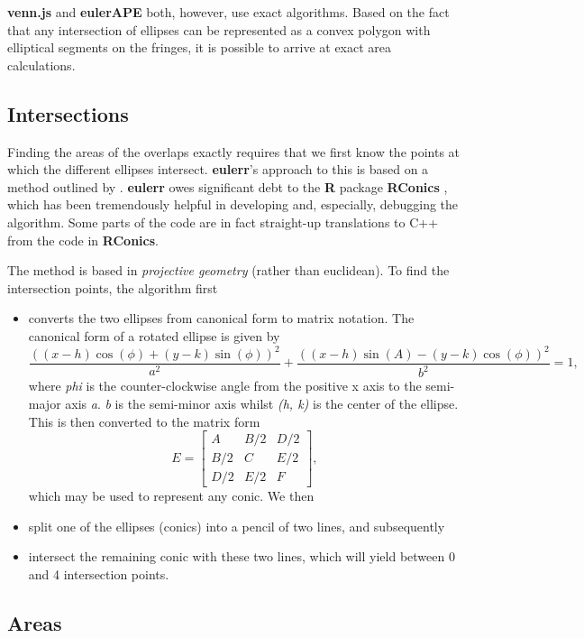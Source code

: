 \documentclass[
  headsepline=true,headings=standardclasses%
]{scrartcl}
\providecommand{\tightlist}{\setlength{\itemsep}{0pt}\setlength{\parskip}{0pt}}
\theoremstyle{definition}
\theoremstyle{definition}
\theoremstyle{definition}
\theoremstyle{remark}
\begin{document}
\textbf{venn.js} and \textbf{eulerAPE} both, however, use exact
algorithms. Based on the fact that any intersection of ellipses can be
represented as a convex polygon with elliptical segments on the fringes,
it is possible to arrive at exact area calculations.

\subsection{Intersections}\label{intersections}

Finding the areas of the overlaps exactly requires that we first know
the points at which the different ellipses intersect. \textbf{eulerr}'s
approach to this is based on a method outlined by
\textcite{richter-gebert_2011}. \textbf{eulerr} owes significant debt to
the \textbf{R} package \textbf{RConics} \autocite{huber_2014}, which has
been tremendously helpful in developing and, especially, debugging the
algorithm. Some parts of the code are in fact straight-up translations
to C++ from the code in \textbf{RConics}.

The method is based in \emph{projective geometry} (rather than
euclidean). To find the intersection points, the algorithm first

\begin{itemize}
\tightlist
\item
  converts the two ellipses from canonical form to matrix notation. The
  canonical form of a rotated ellipse is given by \[
  \frac{((x-h)\cos(\phi)+(y-k)\sin(\phi))^2}{a^2}+\frac{((x-h) \sin(A)-(y-k)
    \cos(\phi))^2}{b^2} = 1,
  \] where \emph{phi} is the counter-clockwise angle from the positive x
  axis to the semi-major axis \emph{a}. \emph{b} is the semi-minor axis
  whilst \emph{(h, k)} is the center of the ellipse. This is then
  converted to the matrix form \[
  E = \begin{bmatrix}A & B/2 & D/2 \\
                 B/2 & C & E/2 \\
                 D/2 & E/2 & F
  \end{bmatrix},
  \] which may be used to represent any conic. We then
\item
  split one of the ellipses (conics) into a pencil of two lines, and
  subsequently
\item
  intersect the remaining conic with these two lines, which will yield
  between 0 and 4 intersection points.
\end{itemize}

\subsection{Areas}\label{areas}
\end{document}
